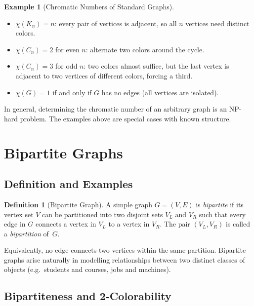 \documentclass[11pt, a4paper, notitlepage]{report}
\theoremstyle{definition}
\newtheorem{definition}[theorem]{Definition}
\newtheorem{example}[theorem]{Example}
\theoremstyle{remark}
\begin{document}
\begin{example}[Chromatic Numbers of Standard Graphs]
\label{ex:chromatic-standard}
\leavevmode
\begin{itemize}
  \item $\chi(K_n) = n$: every pair of vertices is adjacent, so all $n$ vertices need distinct colors.
  \item $\chi(C_n) = 2$ for even $n$: alternate two colors around the cycle.
  \item $\chi(C_n) = 3$ for odd $n$: two colors almost suffice, but the last vertex is adjacent to two vertices of different colors, forcing a third.
  \item $\chi(G) = 1$ if and only if $G$ has no edges (all vertices are isolated).
\end{itemize}
\end{example}

\begin{warning}[title={Warning: Computing $\chi(G)$ Is Hard}]
In general, determining the chromatic number of an arbitrary graph is an NP-hard problem. The examples above are special cases with known structure.
\end{warning}

\section{Bipartite Graphs}
\label{sec:bipartite}

\subsection{Definition and Examples}
\label{subsec:bipartite-def}

\begin{definition}[Bipartite Graph]
\label{def:bipartite}
A simple graph $G = (V, E)$ is \emph{bipartite} if its vertex set $V$ can be partitioned into two disjoint sets $V_L$ and $V_R$ such that every edge in $G$ connects a vertex in $V_L$ to a vertex in $V_R$. The pair $(V_L, V_R)$ is called a \emph{bipartition} of~$G$.
\end{definition}

Equivalently, no edge connects two vertices within the same partition. Bipartite graphs arise naturally in modelling relationships between two distinct classes of objects (e.g.\ students and courses, jobs and machines).

\subsection{Bipartiteness and 2-Colorability}
\label{subsec:bipartite-coloring}
\end{document}
